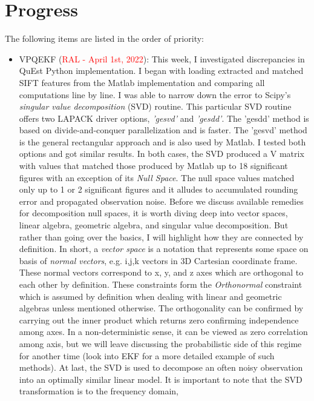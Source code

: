 \documentclass[11pt]{article}
\begin{document}
\section{Progress}
The following items are listed in the order of priority:
\begin{itemize}
    \item VPQEKF (\textcolor{red}{RAL - April 1st, 2022}): This week, I
    investigated discrepancies in QuEst Python implementation. I began with
    loading extracted and matched SIFT features from the Matlab implementation
    and comparing all computations line by line. I was able to narrow down
    the error to Scipy's \emph{singular value decomposition} (SVD) routine.
    This particular SVD routine offers two LAPACK driver options,
    \emph{'gesvd'} and \emph{'gesdd'}. The 'gesdd' method is based on
    divide-and-conquer parallelization and is faster. The 'gesvd' method is the
    general rectangular approach and is also used by Matlab. I tested both
    options and got similar results. In both cases, the SVD produced a V matrix
    with values that matched those produced by Matlab up to 18 significant
    figures with an exception of its \emph{Null Space}. The null space values
    matched only up to 1 or 2 significant figures and it alludes to accumulated
    rounding error and propagated observation noise. Before we discuss available
    remedies for decomposition null spaces, it is worth diving deep into vector
    spaces, linear algebra, geometric algebra, and singular value decomposition.
    But rather than going over the basics, I will highlight how they are connected by
    definition. In short, a \emph{vector space} is a notation that represents
    some space on basis of \emph{normal vectors}, e.g. i,j,k vectors in 3D
    Cartesian coordinate frame. These normal vectors correspond to x, y, and z axes
    which are orthogonal to each other by definition. These constraints form the
    \emph{Orthonormal} constraint which is assumed by definition when dealing
    with linear and geometric algebras unless mentioned otherwise. The
    orthogonality can be confirmed by carrying out the inner product which
    returns zero confirming independence among axes. In a non-deterministic sense,
    it can be viewed as zero correlation among axis, but we will leave discussing the
    probabilistic side of this regime for another time (look into EKF for a more
    detailed example of such methods). At last, the SVD is used to decompose an
    often noisy observation into an optimally similar linear model. It is
    important to note that the SVD transformation is to the frequency domain,

\end{itemize}
\end{document}
